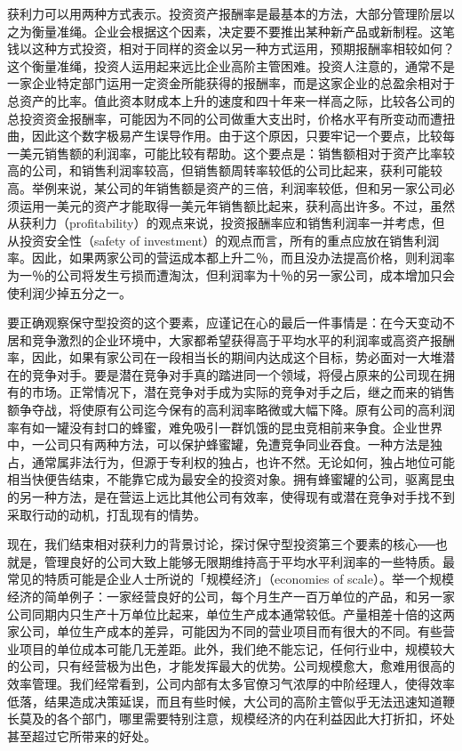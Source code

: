 \documentclass[UTF8,a4paper,zihao=-4,fontset = windows]{ctexart} %
\begin{document}
获利力可以用两种方式表示。投资资产报酬率是最基本的方法，大部分管理阶层以之为衡量准绳。企业会根据这个因素，决定要不要推出某种新产品或新制程。这笔钱以这种方式投资，相对于同样的资金以另一种方式运用，预期报酬率相较如何？这个衡量准绳，投资人运用起来远比企业高阶主管困难。投资人注意的，通常不是一家企业特定部门运用一定资金所能获得的报酬率，而是这家企业的总盈余相对于总资产的比率。值此资本财成本上升的速度和四十年来一样高之际，比较各公司的总投资资金报酬率，可能因为不同的公司做重大支出时，价格水平有所变动而遭扭曲，因此这个数字极易产生误导作用。由于这个原因，只要牢记一个要点，比较每一美元销售额的利润率，可能比较有帮助。这个要点是：销售额相对于资产比率较高的公司，和销售利润率较高，但销售额周转率较低的公司比起来，获利可能较高。举例来说，某公司的年销售额是资产的三倍，利润率较低，但和另一家公司必须运用一美元的资产才能取得一美元年销售额比起来，获利高出许多。不过，虽然从获利力（profitability）的观点来说，投资报酬率应和销售利润率一并考虑，但从投资安全性（safety of investment）的观点而言，所有的重点应放在销售利润率。因此，如果两家公司的营运成本都上升二％，而且没办法提高价格，则利润率为一％的公司将发生亏损而遭淘汰，但利润率为十％的另一家公司，成本增加只会使利润少掉五分之一。

要正确观察保守型投资的这个要素，应谨记在心的最后一件事情是：在今天变动不居和竞争激烈的企业环境中，大家都希望获得高于平均水平的利润率或高资产报酬率，因此，如果有家公司在一段相当长的期间内达成这个目标，势必面对一大堆潜在的竞争对手。要是潜在竞争对手真的踏进同一个领域，将侵占原来的公司现在拥有的市场。正常情况下，潜在竞争对手成为实际的竞争对手之后，继之而来的销售额争夺战，将使原有公司迄今保有的高利润率略微或大幅下降。原有公司的高利润率有如一罐没有封口的蜂蜜，难免吸引一群饥饿的昆虫竞相前来争食。企业世界中，一公司只有两种方法，可以保护蜂蜜罐，免遭竞争同业吞食。一种方法是独占，通常属非法行为，但源于专利权的独占，也许不然。无论如何，独占地位可能相当快便告结束，不能靠它成为最安全的投资对象。拥有蜂蜜罐的公司，驱离昆虫的另一种方法，是在营运上远比其他公司有效率，使得现有或潜在竞争对手找不到采取行动的动机，打乱现有的情势。

现在，我们结束相对获利力的背景讨论，探讨保守型投资第三个要素的核心──也就是，管理良好的公司大致上能够无限期维持高于平均水平利润率的一些特质。最常见的特质可能是企业人士所说的「规模经济」（economies of scale）。举一个规模经济的简单例子：一家经营良好的公司，每个月生产一百万单位的产品，和另一家公司同期内只生产十万单位比起来，单位生产成本通常较低。产量相差十倍的这两家公司，单位生产成本的差异，可能因为不同的营业项目而有很大的不同。有些营业项目的单位成本可能几无差距。此外，我们绝不能忘记，任何行业中，规模较大的公司，只有经营极为出色，才能发挥最大的优势。公司规模愈大，愈难用很高的效率管理。我们经常看到，公司内部有太多官僚习气浓厚的中阶经理人，使得效率低落，结果造成决策延误，而且有些时候，大公司的高阶主管似乎无法迅速知道鞭长莫及的各个部门，哪里需要特别注意，规模经济的内在利益因此大打折扣，坏处甚至超过它所带来的好处。
\end{document}
